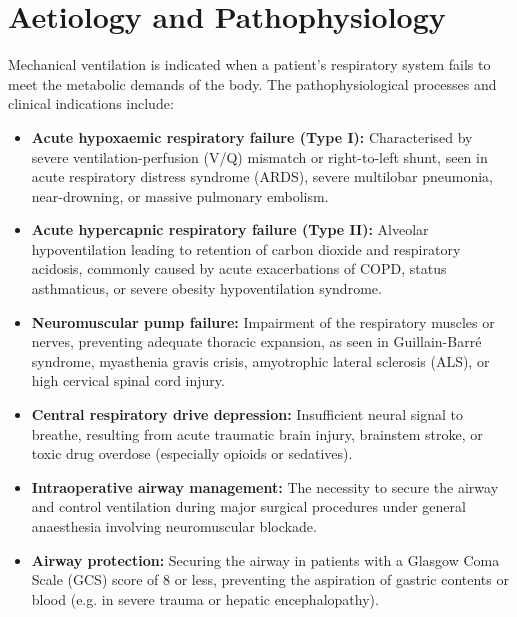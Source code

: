 \section*{Aetiology and Pathophysiology}
Mechanical ventilation is indicated when a patient's respiratory system fails to meet the metabolic demands of the body. The pathophysiological processes and clinical indications include:
\begin{itemize}
    \item \textbf{Acute hypoxaemic respiratory failure (Type I):} Characterised by severe ventilation-perfusion (V/Q) mismatch or right-to-left shunt, seen in acute respiratory distress syndrome (ARDS), severe multilobar pneumonia, near-drowning, or massive pulmonary embolism.
    \item \textbf{Acute hypercapnic respiratory failure (Type II):} Alveolar hypoventilation leading to retention of carbon dioxide and respiratory acidosis, commonly caused by acute exacerbations of COPD, status asthmaticus, or severe obesity hypoventilation syndrome.
    \item \textbf{Neuromuscular pump failure:} Impairment of the respiratory muscles or nerves, preventing adequate thoracic expansion, as seen in Guillain-Barré syndrome, myasthenia gravis crisis, amyotrophic lateral sclerosis (ALS), or high cervical spinal cord injury.
    \item \textbf{Central respiratory drive depression:} Insufficient neural signal to breathe, resulting from acute traumatic brain injury, brainstem stroke, or toxic drug overdose (especially opioids or sedatives).
    \item \textbf{Intraoperative airway management:} The necessity to secure the airway and control ventilation during major surgical procedures under general anaesthesia involving neuromuscular blockade.
    \item \textbf{Airway protection:} Securing the airway in patients with a Glasgow Coma Scale (GCS) score of 8 or less, preventing the aspiration of gastric contents or blood (e.g. in severe trauma or hepatic encephalopathy).
\end{itemize}

